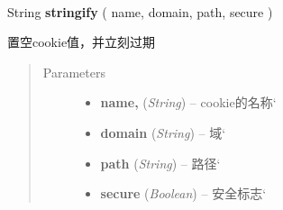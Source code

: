 \documentclass[letterpaper,10pt,english]{sphinxmanual}
\begin{document}

\begin{fulllineitems}
\label{api/core/cookie/index:cookie.remove}~
\begin{DUlineblock}{0em}
\item[] String \textbf{stringify} ( name, domain, path, secure )
\item[] 置空cookie值，并立刻过期
\end{DUlineblock}
\begin{quote}\begin{description}
\item[{Parameters}] \leavevmode\begin{itemize}
\item {}
\textbf{name,} (\emph{String}) -- cookie的名称{}`

\item {}
\textbf{domain} (\emph{String}) -- 域{}`

\item {}
\textbf{path} (\emph{String}) -- 路径{}`

\item {}
\textbf{secure} (\emph{Boolean}) -- 安全标志{}`

\end{itemize}

\end{description}\end{quote}

\end{fulllineitems}


\end{document}
